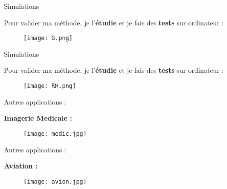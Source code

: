\documentclass[11pt]{beamer}
\begin{document}

\begin{frame}{Simulations}

Pour valider ma méthode, je l'\textbf{étudie} et je fais des \textbf{tests} sur ordinateur :

\pause
\begin{center}
\begin{figure}
\texttt{[image: G.png]}
\end{figure}
\end{center}

\end{frame}


\begin{frame}{Simulations}

Pour valider ma méthode, je l'\textbf{étudie} et je fais des \textbf{tests} sur ordinateur :

\begin{center}
\begin{figure}
\texttt{[image: RH.png]}
\end{figure}
\end{center}

\end{frame}


\begin{frame}{Autres applications :}

\textbf{Imagerie Medicale :}
\begin{center}
\begin{figure}
\texttt{[image: medic.jpg]}
\end{figure}
\end{center}

\end{frame}


\begin{frame}{Autres applications :}

\textbf{Aviation :}
\begin{center}
\begin{figure}
\texttt{[image: avion.jpg]}
\end{figure}
\end{center}

\end{frame}
\end{document}
